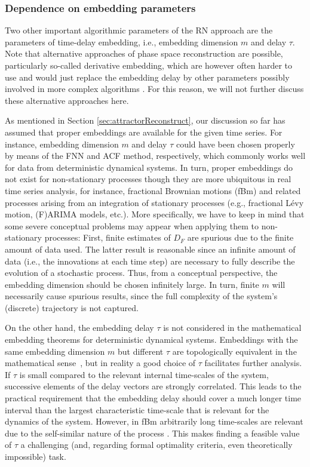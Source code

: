 		\subsubsection{Dependence on embedding parameters} \label{subsubsec:embedding}
Two other important algorithmic parameters of the RN approach are the parameters of time-delay embedding, i.e., embedding dimension $m$ and delay $\tau$. Note that alternative approaches of phase space reconstruction are possible, particularly so-called derivative embedding, which are however often harder to use and would just replace the embedding delay by other parameters possibly involved in more complex algorithms \cite{Lekscha2018}. For this reason, we will not further discuss these alternative approaches here.

		As mentioned in Section \ref{sec:attractorReconstruct}, our discussion so far has assumed that proper embeddings are available for the given time series. For instance, embedding dimension $m$ and delay $\tau$ could have been chosen properly by means of the FNN and ACF method, respectively, which commonly works well for data from deterministic dynamical systems. In turn, proper embeddings do not exist for non-stationary processes though they are more ubiquitous in real time series analysis, for instance, fractional Brownian motions (fBm) and related processes arising from an integration of stationary processes (e.g., fractional L\'evy motion, (F)ARIMA models, etc.). More specifically, we have to keep in mind that some severe conceptual problems may appear when applying them to non-stationary processes: First, finite estimates of $D_F$ are spurious due to the finite amount of data used. The latter result is reasonable since an infinite amount of data (i.e., the innovations at each time step) are necessary to fully describe the evolution of a stochastic process. Thus, from a conceptual perspective, the embedding dimension should be chosen infinitely large. In turn, finite $m$ will necessarily cause spurious results, since the full complexity of the system's (discrete) trajectory is not captured.

		On the other hand, the embedding delay $\tau$ is not considered in the mathematical embedding theorems for deterministic dynamical systems. Embeddings with the same embedding dimension $m$ but different $\tau$ are topologically equivalent in the mathematical sense~\cite{kantz1997}, but in reality a good choice of $\tau$ facilitates further analysis. If $\tau$ is small compared to the relevant internal time-scales of the system, successive elements of the delay vectors are strongly correlated. This leads to the practical requirement that the embedding delay should cover a much longer time interval than the largest characteristic time-scale that is relevant for the dynamics of the system. However, in fBm arbitrarily long time-scales are relevant due to the self-similar nature of the process \cite{Zou2015}. This makes finding a feasible value of $\tau$ a challenging (and, regarding formal optimality criteria, even theoretically impossible) task.

